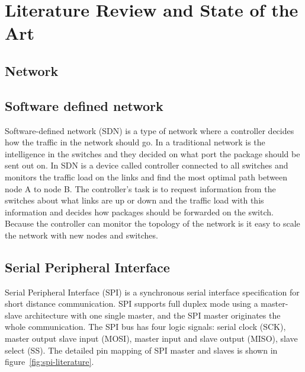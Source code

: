 \documentclass[11pt, titlepage]{article} %
\begin{document}
\section{Literature Review and State of the Art}

\subsection{Network}
\subsection{Software defined network}
Software-defined network (SDN) is a type of network where a controller decides how the traffic in the network should go. In a traditional network is the intelligence in the switches and they decided on what port the package should be sent out on. In SDN is a device called controller connected to all switches and monitors the traffic load on the links and find the most optimal path between node A to node B. The controller’s task is to request information from the switches about what links are up or down and the traffic load with this information and decides how packages should be forwarded on the switch. Because the controller can monitor the topology of the network is it easy to scale the network with new nodes and switches\cite{doi:10.1002/sec.1737}. 


\subsection{Serial Peripheral Interface}
Serial Peripheral Interface (SPI) is a synchronous serial interface specification for short distance communication. SPI supports full duplex mode using a master-slave architecture with one single master, and the SPI master originates the whole communication. The SPI bus has four logic signals: serial clock (SCK), master output slave input (MOSI), master input and slave output (MISO), slave select (SS). The detailed pin mapping of SPI master and slaves is shown in figure~\ref{fig:spi-literature}.
\end{document}
